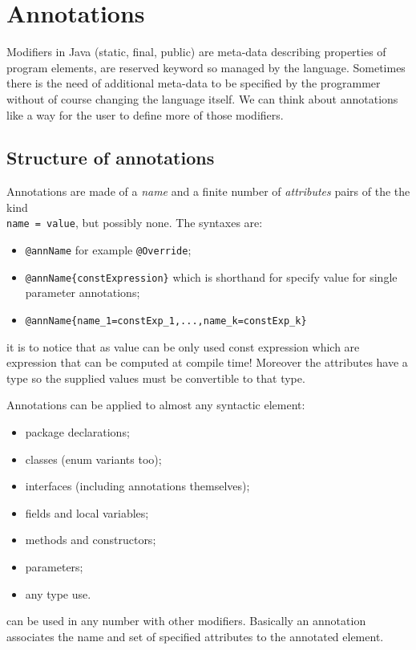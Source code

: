 \section{Annotations}
Modifiers in Java (static, final, public) are meta-data describing properties of program elements, are reserved keyword so managed by the language.
Sometimes there is the need of additional meta-data to be specified by the programmer without of course changing the language itself.
We can think about annotations like a way for the user to define more of those modifiers.

\subsection{Structure of annotations}
Annotations are made of a \emph{name} and a finite number of \emph{attributes} pairs of the the kind \\
\verb|name = value|, but possibly none.
The syntaxes are:
\begin{itemize}
    \item \verb|@annName| for example \verb|@Override|;
    \item \verb|@annName{constExpression}| which is shorthand for specify value for single parameter annotations;
    \item \verb|@annName{name_1=constExp_1,...,name_k=constExp_k}|
\end{itemize}
it is to notice that as value can be only used const expression which are expression that can be computed at compile time!
Moreover the attributes have a type so the supplied values must be convertible to that type.

Annotations can be applied to almost any syntactic element:
\begin{itemize}
    \item package declarations;
    \item classes (enum variants too);
    \item interfaces (including annotations themselves);
    \item fields and local variables;
    \item methods and constructors;
    \item parameters;
    \item any type use.
\end{itemize}
can be used in any number with other modifiers.
Basically an annotation associates the name and set of specified attributes to the annotated element.

